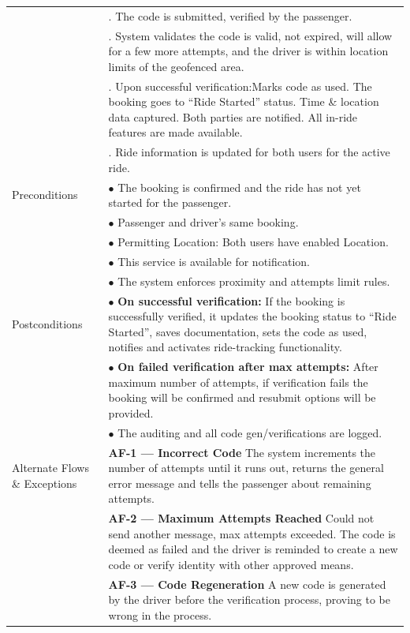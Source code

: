 \begin{longtable}{|>{\raggedright\arraybackslash}p{4cm}|>{\raggedright\arraybackslash}p{11cm}|}
& 6. The code is submitted, verified by the passenger. \\
& 7. System validates the code is valid, not expired, will allow for a few more attempts, and the driver is within location limits of the geofenced area. \\
& 8. Upon successful verification:Marks code as used. The booking goes to “Ride Started” status. Time \& location data captured. Both parties are notified. All in-ride features are made available. \\
& 9. Ride information is updated for both users for the active ride. \\
\hline
Preconditions & $\bullet$ The booking is confirmed and the ride has not yet started for the passenger. \\
& $\bullet$ Passenger and driver's same booking. \\
& $\bullet$ Permitting Location: Both users have enabled Location. \\
& $\bullet$ This service is available for notification. \\
& $\bullet$ The system enforces proximity and attempts limit rules. \\
\hline
Postconditions & $\bullet$ \textbf{On successful verification:} If the booking is successfully verified, it updates the booking status to “Ride Started”, saves documentation, sets the code as used, notifies and activates ride-tracking functionality. \\
& $\bullet$ \textbf{On failed verification after max attempts:} After maximum number of attempts, if verification fails the booking will be confirmed and resubmit options will be provided. \\
& $\bullet$ The auditing and all code gen/verifications are logged. \\
\hline
Alternate Flows \& Exceptions & \textbf{AF-1 — Incorrect Code} \newline The system increments the number of attempts until it runs out, returns the general error message and tells the passenger about remaining attempts. \\
& \textbf{AF-2 — Maximum Attempts Reached} \newline Could not send another message, max attempts exceeded. The code is deemed as failed and the driver is reminded to create a new code or verify identity with other approved means. \\
& \textbf{AF-3 — Code Regeneration} \newline A new code is generated by the driver before the verification process, proving to be wrong in the process. \\

\end{longtable}
